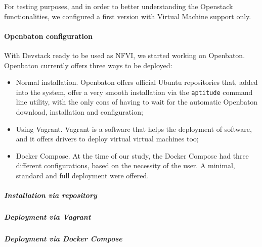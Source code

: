 For testing purposes, and in order to better understanding the Openstack
functionalities, we configured a first version with Virtual Machine support
only.

\paragraph*{Openbaton configuration}
With Devstack ready to be used as NFVI, we started working on Openbaton.
Openbaton currently offers three ways to be deployed:
\begin{itemize}
  \item Normal installation. Openbaton offers official Ubuntu repositories that,
    added into the system, offer a very smooth installation via the
    \verb!aptitude! command line utility, with the only cons of having to wait
    for the automatic Openbaton download, installation and configuration;
  \item Using Vagrant. Vagrant is a software that helps the deployment of
    software, and it offers drivers to deploy virtual virtual machines too;
  \item Docker Compose. At the time of our study, the Docker Compose had three
    different configurations, based on the necessity of the user. A minimal,
    standard and full deployment were offered.
\end{itemize}

\subparagraph*{Installation via repository}

\subparagraph*{Deployment via Vagrant}

\subparagraph*{Deployment via Docker Compose}
